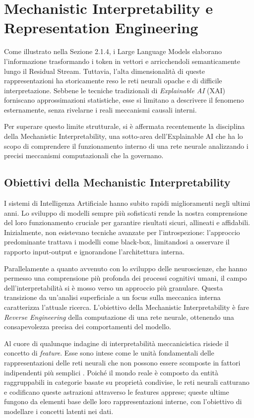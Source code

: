 \section{Mechanistic Interpretability e Representation Engineering}
Come illustrato nella Sezione 2.1.4, i Large Language Models elaborano l'informazione trasformando i token in vettori e arricchendoli semanticamente lungo il Residual Stream. Tuttavia, l'alta dimensionalità di queste rappresentazioni ha storicamente reso le reti neurali opache e di difficile interpretazione. Sebbene le tecniche tradizionali di \textit{Explainable AI} (XAI) forniscano approssimazioni statistiche, esse si limitano a descrivere il fenomeno esternamente, senza rivelarne i reali meccanismi causali interni.

Per superare questo limite strutturale, si è affermata recentemente la disciplina della Mechanistic Interpretability, una sotto-area dell'Explainable AI che ha lo scopo di comprendere il funzionamento interno di una rete neurale analizzando i precisi meccanismi computazionali che la governano.

\subsection{Obiettivi della Mechanistic Interpretability}
I sistemi di Intelligenza Artificiale hanno subito rapidi miglioramenti negli ultimi anni. Lo sviluppo di modelli sempre più sofisticati rende la nostra comprensione del loro funzionamento cruciale per garantire risultati sicuri, allineati e affidabili.
Inizialmente, non esistevano tecniche avanzate per l'introspezione: l'approccio predominante trattava i modelli come black-box, limitandosi a osservare il rapporto input-output e ignorandone l'architettura interna.

Parallelamente a quanto avvenuto con lo sviluppo delle neuroscienze, che hanno permesso una comprensione più profonda dei processi cognitivi umani, il campo dell'interpretabilità si è mosso verso un approccio più granulare. Questa transizione da un'analisi superficiale a un focus sulla meccanica interna caratterizza l'attuale ricerca. L'obiettivo della Mechanistic Interpretability è fare \textit{Reverse Engineering} della computazione di una rete neurale, ottenendo una consapevolezza precisa dei comportamenti del modello.

Al cuore di qualunque indagine di interpretabilità meccanicistica risiede il concetto di \textit{feature}. Esse sono intese come le unità fondamentali delle rappresentazioni delle reti neurali che non possono essere scomposte in fattori indipendenti più semplici \cite{bereska2024mechanisticinterpretabilityaisafety}. Poiché il mondo reale è composto da entità raggruppabili in categorie basate su proprietà condivise, le reti neurali catturano e codificano queste astrazioni attraverso le features apprese; queste ultime fungono da elementi base delle loro rappresentazioni interne, con l'obiettivo di modellare i concetti latenti nei dati.

